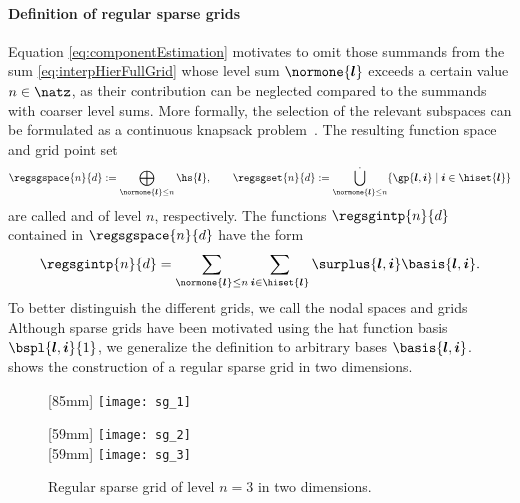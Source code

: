 \paragraph{Definition of regular sparse grids}

Equation \eqref{eq:componentEstimation} motivates to omit those summands
from the sum \eqref{eq:interpHierFullGrid} whose level sum $\normone{\*l}$
exceeds a certain value $n \in \natz$,
as their contribution can be neglected compared to the summands
with coarser level sums.
More formally, the selection of the relevant subspaces can be formulated as a
continuous knapsack problem~\cite{Bungartz04Sparse}.
The resulting function space and grid point set
\begin{equation}
  \label{eq:regularSG}
  \regsgspace{n}{d}
  := \bigoplus_{\normone{\*l} \le n} \hs{\*l},\qquad
  \regsgset{n}{d}
  := \bigdotcup_{\normone{\*l} \le n}
  \{\gp{\*l,\*i} \mid \*i \in \hiset{\*l}\}
\end{equation}
are called  and
 of level $n$, respectively.
The functions $\regsgintp{n}{d}$ contained in
$\regsgspace{n}{d}$ have the form
\begin{equation}
  \label{eq:regularSGInterpolant}
  \regsgintp{n}{d}
  = \sum_{\normone{\*l} \le n} \sum_{\*i \in \hiset{\*l}}
  \surplus{\*l,\*i} \basis{\*l,\*i}.
\end{equation}
To better distinguish the different grids,
we call the nodal spaces and grids 
Although sparse grids have been motivated using the hat function
basis $\bspl{\*l,\*i}{1}$,
we generalize the definition to arbitrary bases $\basis{\*l,\*i}$.
 shows the construction of a
regular sparse grid in two dimensions.

\begin{figure}
  [85mm]{%
    \texttt{[image: sg\_1]}%
  }%
  \hfill%
  \begin{minipage}[b]{59mm}
    [59mm]{%
      \texttt{[image: sg\_2]}%
    }\\[4mm]%
    [59mm]{%
      \texttt{[image: sg\_3]}%
    }%
  \end{minipage}%
  \caption[%
    Regular two-dimensional sparse grid%
  ]{%
    Regular sparse grid of level $n = 3$ in two dimensions.%
  }%
  \label{fig:regularSG}%
\end{figure}

